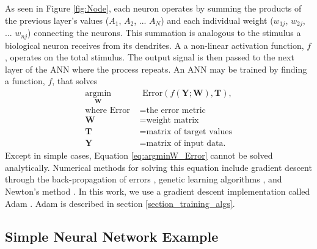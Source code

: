 As seen in Figure \ref{fig:Node}, each neuron operates by summing the products of the previous layer's values ($A{_1}$, $A{_2}$, ... $A{_N}$) and each individual weight ($w_{1j}$, $w_{2j}$, ... $w_{nj}$) connecting the neurons. This summation is analogous to the stimulus a biological neuron receives from its dendrites. A a non-linear activation function, $f$, operates on the total stimulus. The output signal is then passed to the next layer of the ANN where the process repeats. An ANN may be trained by finding a function, $f$, that solves
%
\begin{align} \label{eq:argminW_Error}
\underset{\mathbf{W}}{\text{argmin}} &{\text{ Error}}(f(\mathbf{Y} ; \mathbf{W} ) , \mathbf{T} ), \\
\text{where Error } &= \text{the error metric} \nonumber \\
\mathbf{W} &= \text{weight matrix} \nonumber \\
\mathbf{T} &= \text{matrix of target values} \nonumber \\
\mathbf{Y} &= \text{matrix of input data.} \nonumber
\end{align}
%
Except in simple cases, Equation \ref{eq:argminW_Error} cannot be solved analytically. Numerical methods for solving this equation include gradient descent through the back-propagation of errors \cite{Rumelhart1986}, genetic learning algorithms \cite{Yao1999}, and Newton's method \cite{Fletcher2000}. In this work, we use a gradient descent implementation called Adam \cite{Kingma2015}. Adam is described in section \ref{section_training_algs}.


\subsection{Simple Neural Network Example}

